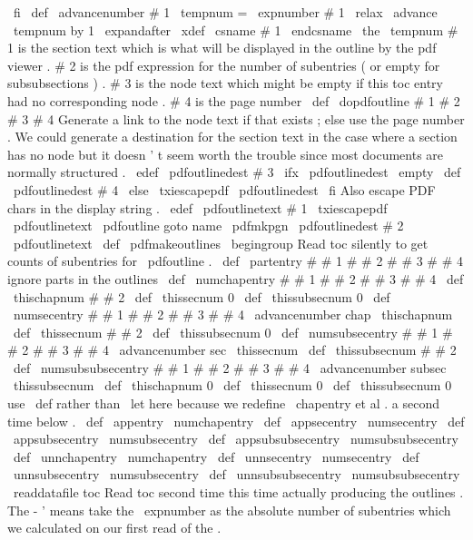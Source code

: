{{\
fi
}
\
def
\
advancenumber
#
1
{
\
tempnum
=
\
expnumber
{
#
1
}
\
relax
\
advance
\
tempnum
by
1
\
expandafter
\
xdef
\
csname
#
1
\
endcsname
{
\
the
\
tempnum
}
}
%
%
#
1
is
the
section
text
which
is
what
will
be
displayed
in
the
%
outline
by
the
pdf
viewer
.
#
2
is
the
pdf
expression
for
the
number
%
of
subentries
(
or
empty
for
subsubsections
)
.
#
3
is
the
node
text
%
which
might
be
empty
if
this
toc
entry
had
no
corresponding
node
.
%
#
4
is
the
page
number
%
\
def
\
dopdfoutline
#
1
#
2
#
3
#
4
{
%
%
Generate
a
link
to
the
node
text
if
that
exists
;
else
use
the
%
page
number
.
We
could
generate
a
destination
for
the
section
%
text
in
the
case
where
a
section
has
no
node
but
it
doesn
'
t
%
seem
worth
the
trouble
since
most
documents
are
normally
structured
.
\
edef
\
pdfoutlinedest
{
#
3
}
%
\
ifx
\
pdfoutlinedest
\
empty
\
def
\
pdfoutlinedest
{
#
4
}
%
\
else
\
txiescapepdf
\
pdfoutlinedest
\
fi
%
%
Also
escape
PDF
chars
in
the
display
string
.
\
edef
\
pdfoutlinetext
{
#
1
}
%
\
txiescapepdf
\
pdfoutlinetext
%
\
pdfoutline
goto
name
{
\
pdfmkpgn
{
\
pdfoutlinedest
}
}
#
2
{
\
pdfoutlinetext
}
%
}
%
\
def
\
pdfmakeoutlines
{
%
\
begingroup
%
Read
toc
silently
to
get
counts
of
subentries
for
\
pdfoutline
.
\
def
\
partentry
#
#
1
#
#
2
#
#
3
#
#
4
{
}
%
ignore
parts
in
the
outlines
\
def
\
numchapentry
#
#
1
#
#
2
#
#
3
#
#
4
{
%
\
def
\
thischapnum
{
#
#
2
}
%
\
def
\
thissecnum
{
0
}
%
\
def
\
thissubsecnum
{
0
}
%
}
%
\
def
\
numsecentry
#
#
1
#
#
2
#
#
3
#
#
4
{
%
\
advancenumber
{
chap
\
thischapnum
}
%
\
def
\
thissecnum
{
#
#
2
}
%
\
def
\
thissubsecnum
{
0
}
%
}
%
\
def
\
numsubsecentry
#
#
1
#
#
2
#
#
3
#
#
4
{
%
\
advancenumber
{
sec
\
thissecnum
}
%
\
def
\
thissubsecnum
{
#
#
2
}
%
}
%
\
def
\
numsubsubsecentry
#
#
1
#
#
2
#
#
3
#
#
4
{
%
\
advancenumber
{
subsec
\
thissubsecnum
}
%
}
%
\
def
\
thischapnum
{
0
}
%
\
def
\
thissecnum
{
0
}
%
\
def
\
thissubsecnum
{
0
}
%
%
%
use
\
def
rather
than
\
let
here
because
we
redefine
\
chapentry
et
%
al
.
a
second
time
below
.
\
def
\
appentry
{
\
numchapentry
}
%
\
def
\
appsecentry
{
\
numsecentry
}
%
\
def
\
appsubsecentry
{
\
numsubsecentry
}
%
\
def
\
appsubsubsecentry
{
\
numsubsubsecentry
}
%
\
def
\
unnchapentry
{
\
numchapentry
}
%
\
def
\
unnsecentry
{
\
numsecentry
}
%
\
def
\
unnsubsecentry
{
\
numsubsecentry
}
%
\
def
\
unnsubsubsecentry
{
\
numsubsubsecentry
}
%
\
readdatafile
{
toc
}
%
%
%
Read
toc
second
time
this
time
actually
producing
the
outlines
.
%
The
-
'
means
take
the
\
expnumber
as
the
absolute
number
of
%
subentries
which
we
calculated
on
our
first
read
of
the
.
}}
